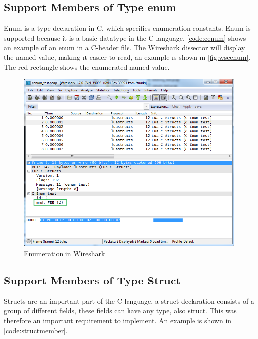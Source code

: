 \subsection{Support Members of Type enum}
\label{sec:supportenum}
Enum is a type declaration in C, which specifies enumeration constants.  Enum 
is supported because it is a basic datatype in the C language. 
\autoref{code:cenum} shows an example of an enum in a C-header file. The 
Wireshark dissector will display the named value, making it 
easier to read, an example is shown in \autoref{fig:wscenum}. The red 
rectangle shows the enumerated named value.

\begin{figure}[ht]
	\center
	\includegraphics[width=\textwidth]{./sprints/img/wireshark_cenum}
	\caption{Enumeration in Wireshark\label{fig:wscenum}}
\end{figure}



\subsection{Support Members of Type Struct}
Structs are an important part of the C language, a struct declaration consists 
of a group of different fields, these fields can have any type, also struct. 
This was therefore an important requirement to implement. An example is shown 
in \autoref{code:structmember}.

